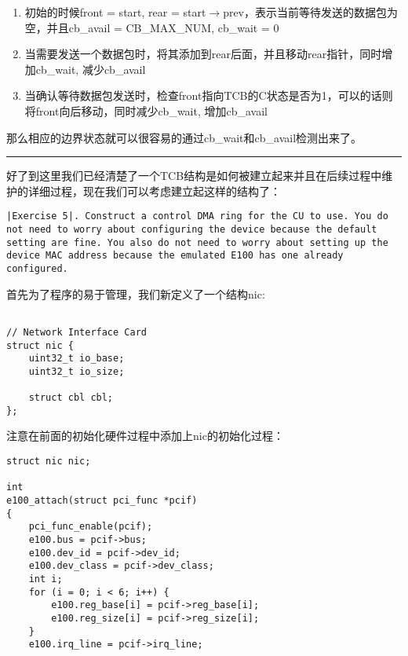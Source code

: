\documentclass{article}
\begin{document}
\begin{CJK*}{UTF8}{gkai}
\begin{enumerate}
\item{初始的时候front = start, rear = start$\rightarrow$prev，表示当前等待发送的数据包为空，并且cb\_avail = CB\_MAX\_NUM, cb\_wait = 0}
\item{当需要发送一个数据包时，将其添加到rear后面，并且移动rear指针，同时增加cb\_wait, 减少cb\_avail}
\item{当确认等待数据包发送时，检查front指向TCB的C状态是否为1，可以的话则将front向后移动，同时减少cb\_wait, 增加cb\_avail}

\end{enumerate}

那么相应的边界状态就可以很容易的通过cb\_wait和cb\_avail检测出来了。

\vspace{2em}
\hrule
\vspace{2em}

好了到这里我们已经清楚了一个TCB结构是如何被建立起来并且在后续过程中维护的详细过程，现在我们可以考虑建立起这样的结构了：

\begin{lstlisting}[style=exercise]
|Exercise 5|. Construct a control DMA ring for the CU to use. You do not need to worry about configuring the device because the default setting are fine. You also do not need to worry about setting up the device MAC address because the emulated E100 has one already configured.
\end{lstlisting}

首先为了程序的易于管理，我们新定义了一个结构nic:

\begin{lstlisting}[style=ccode, title={\scriptsize \ttfamily \bfseries kern/e100.h}]

// Network Interface Card
struct nic {
    uint32_t io_base;
    uint32_t io_size;

    struct cbl cbl;
};\end{lstlisting}

注意在前面的初始化硬件过程中添加上nic的初始化过程：

\begin{lstlisting}[style=ccode, firstnumber=36, title={\scriptsize \ttfamily \bfseries kern/e100.c}]
struct nic nic;

int
e100_attach(struct pci_func *pcif) 
{
    pci_func_enable(pcif);
    e100.bus = pcif->bus;
    e100.dev_id = pcif->dev_id;
    e100.dev_class = pcif->dev_class;
    int i;
    for (i = 0; i < 6; i++) {
    	e100.reg_base[i] = pcif->reg_base[i];
        e100.reg_size[i] = pcif->reg_size[i];
    }
    e100.irq_line = pcif->irq_line;


\end{lstlisting}
\end{CJK*}
\end{document}
